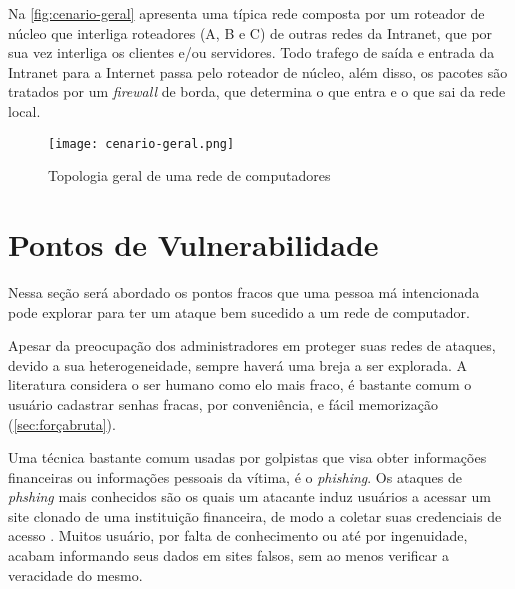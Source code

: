 Na \autoref{fig:cenario-geral} apresenta uma típica rede composta por um roteador de núcleo que interliga roteadores (A, B e C) de outras redes da Intranet, que por sua vez interliga os clientes e/ou servidores. Todo trafego de saída e entrada da Intranet para a Internet passa pelo roteador de núcleo, além disso, os pacotes são tratados por um \textit{firewall} de borda, que determina o que entra e o que sai da rede local.

\begin{figure}[!htb]
    \centering
    \caption{Topologia geral de uma rede de computadores} 
    \texttt{[image: cenario-geral.png]}
    \label{fig:cenario-geral}
\end{figure}

\section{Pontos de Vulnerabilidade} \label{sec:pontos-vulnerabilidade}

Nessa seção será abordado os pontos fracos que uma pessoa má intencionada pode explorar para ter um ataque bem sucedido a um rede de computador.

Apesar da preocupação dos administradores em proteger suas redes de ataques, devido a sua heterogeneidade, sempre haverá uma breja a ser explorada. A literatura considera o ser humano como elo mais fraco, é bastante comum o usuário cadastrar senhas fracas, por conveniência, e fácil memorização (\autoref{sec:forçabruta}).

Uma técnica bastante comum usadas por golpistas que visa obter informações financeiras ou informações pessoais da vítima, é o \textit{phishing}. Os ataques de \textit{phshing} mais conhecidos são os quais um atacante induz usuários a acessar um site clonado de uma instituição financeira, de modo a coletar suas credenciais de acesso \cite{esr:tratamento}. Muitos usuário, por falta de conhecimento ou até por ingenuidade, acabam informando seus dados em sites falsos, sem ao menos verificar a veracidade do mesmo.

